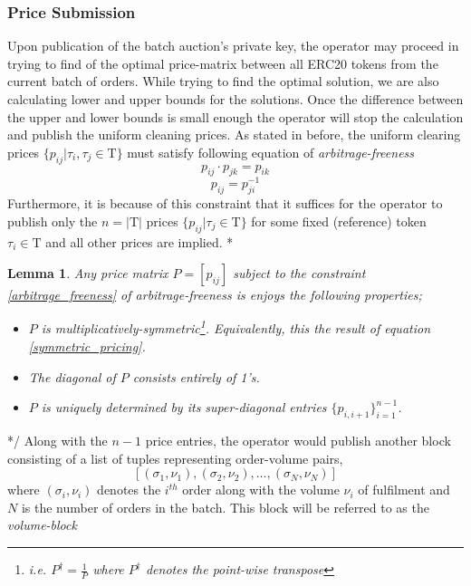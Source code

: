 \documentclass[11pt,parskip=full]{scrartcl}%
\newcommand{\Tau}{\mathrm{T}}
\newtheorem{lemma}[theorem]{Lemma}
\newcommand*{\erc}{ERC20 }
\begin{document}
\subsubsection{Price Submission}
Upon publication of the batch auction's private key, the operator may proceed in trying to find of the optimal price-matrix between all \erc tokens from the current batch of orders. 
While trying to find the optimal solution, we are also calculating lower and upper bounds for the solutions. Once the difference between the upper and lower bounds is small enough the operator will stop the calculation and publish the uniform cleaning prices.
As stated in before, the uniform clearing prices $\{p_{ij}| \tau_i, \tau_j \in \Tau \}$  must satisfy following equation of \emph{arbitrage-freeness} 
\begin{equation}\label{arbitrage_freeness}
p_{ij} \cdot p_{jk} = p_{ik}
\end{equation}
\begin{equation}\label{symmetric_pricing}
p_{ij} = p_{ji}^{-1}
\end{equation}
Furthermore, it is because of this constraint that it suffices for the operator to publish only the $n=|\Tau|$ prices $\{p_{ij}| \tau_j \in \Tau \}$ for some fixed (reference) token $ \tau_i \in \Tau$ and all other prices are implied.
\/* 
\begin{lemma}
Any price matrix $P = [p_{ij}]$ subject to the constraint \ref{arbitrage_freeness} of arbitrage-freeness is enjoys the following properties;
\begin{itemize}
\item[(i)] $P$ is multiplicatively-symmetric\footnote{i.e. $P^\dagger = \frac{1}{P}$ where $P^\dagger$ denotes the point-wise transpose}. Equivalently, this the result of equation \ref{symmetric_pricing}.
\item[(ii)] The diagonal of $P$ consists entirely of 1's.
\item[(iii)]  $P$ is uniquely determined by its super-diagonal entries $\{p_{i, i+1}\}_{i=1}^{n-1}$.
\end{itemize}
\end{lemma}
*/
Along with the $n-1$ price entries, the operator would publish another block consisting of a list of tuples representing order-volume pairs, 
\[[(\sigma_1, \nu_1), (\sigma_2,  \nu_2), \dots, (\sigma_N, \nu_N)]\]
where $(\sigma_i, \nu_i)$ denotes the $i^{th}$ order along with the volume $\nu_i$ of fulfilment and $N$ is the number of orders in the batch. 
This block will be referred to as the \emph{volume-block}\label{volumeBlock}
\end{document}
